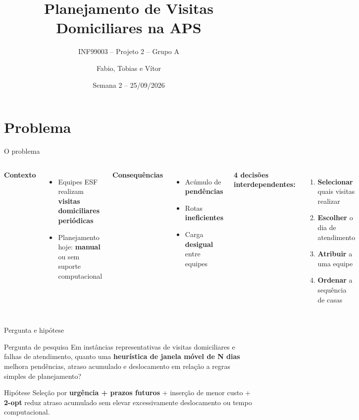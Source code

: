 \documentclass[aspectratio=169]{beamer}
\title[PHVD-APS -- Projeto de Pesquisa]{Planejamento de Visitas Domiciliares na APS\\}
\subtitle{INF99003 -- Projeto 2 -- Grupo A}
\author{Fabio, Tobias e V\'itor}
\date{Semana 2 -- 25/09/2026}
\begin{document}
\begin{frame}
  \titlepage
\end{frame}

\section{Problema}

\begin{frame}{O problema}
  \begin{columns}[T]
      \textbf{Contexto}
      \begin{itemize}
        \item Equipes ESF realizam \textbf{visitas domiciliares peri\'odicas}
        \item Planejamento hoje: \textbf{manual} ou sem suporte computacional
      \end{itemize}
      \vspace{0.4em}
      \textbf{Consequ\^encias}
      \begin{itemize}
        \item Ac\'umulo de \textbf{pend\^encias}
        \item Rotas \textbf{ineficientes}
        \item Carga \textbf{desigual} entre equipes
      \end{itemize}
      \textbf{4 decis\~oes interdependentes:}
      \vspace{0.3em}
      \begin{enumerate}
        \item \textbf{Selecionar} quais visitas realizar
        \item \textbf{Escolher} o dia de atendimento
        \item \textbf{Atribuir} a uma equipe
        \item \textbf{Ordenar} a sequ\^encia de casas
      \end{enumerate}
      \vspace{0.4em}
  \end{columns}
\end{frame}

\begin{frame}{Pergunta e hip\'otese}
  \begin{block}{Pergunta de pesquisa}
    Em inst\^ancias representativas de visitas domiciliares e falhas de
    atendimento, quanto uma \textbf{heur\'istica de janela m\'ovel de N dias}
    melhora pend\^encias, atraso acumulado e deslocamento em rela\c{c}\~ao a
    regras simples de planejamento?
  \end{block}
  \vspace{0.5em}
  \begin{alertblock}{Hip\'otese}
    Sele\c{c}\~ao por \textbf{urg\^encia + prazos futuros} + inser\c{c}\~ao de
    menor custo + \textbf{2-opt} reduz atraso acumulado sem elevar
    excessivamente deslocamento ou tempo computacional.
  \end{alertblock}
\end{frame}
\end{document}
